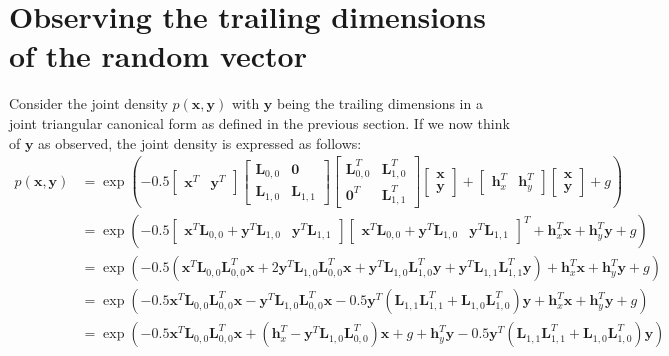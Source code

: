 \documentclass[oneside,english]{scrbook}
\begin{document}
\section{Observing the trailing dimensions of the random vector}
Consider the joint density $p(\bm{x},\bm{y})$ with $\bm{y}$ being the
trailing dimensions in a joint triangular canonical form as defined in
the previous section. If we now think of $\bm{y}$ as observed, the
joint density is expressed as follows:
\begin{align}
  p(\bm{x},\bm{y})
  &= \exp\left(-0.5
  \begin{bmatrix}
    \bm{x}^T & \bm{y}^T
  \end{bmatrix}
  \begin{bmatrix}
    \bm{L}_{0,0} & \bm{0}\\
    \bm{L}_{1,0} & \bm{L}_{1,1}
  \end{bmatrix}
  \begin{bmatrix}
    \bm{L}_{0,0}^T & \bm{L}_{1,0}^T\\
    \bm{0}^T & \bm{L}_{1,1}^T
  \end{bmatrix}
  \begin{bmatrix}
    \bm{x} \\ \bm{y}
  \end{bmatrix} +
  \begin{bmatrix}
    \bm{h}_x^T & \bm{h}_y^T
  \end{bmatrix}
  \begin{bmatrix}
    \bm{x} \\ \bm{y}
  \end{bmatrix} +
  g \right) \nonumber \\
  &= \exp\left(-0.5
  \begin{bmatrix}
    \bm{x}^T\bm{L}_{0,0}+\bm{y}^T\bm{L}_{1,0} & \bm{y}^T\bm{L}_{1,1}
  \end{bmatrix}
  \begin{bmatrix}
    \bm{x}^T\bm{L}_{0,0}+\bm{y}^T\bm{L}_{1,0} & \bm{y}^T\bm{L}_{1,1}
  \end{bmatrix}^T+
  \bm{h}_x^T\bm{x} + \bm{h}_y^T\bm{y} +  g \right) \nonumber\\
  &= \exp\left(-0.5\left(
    \bm{x}^T\bm{L}_{0,0}\bm{L}_{0,0}^T\bm{x}+2\bm{y}^T\bm{L}_{1,0}\bm{L}_{0,0}^T\bm{x} +  \bm{y}^T\bm{L}_{1,0}\bm{L}_{1,0}^T\bm{y} + \bm{y}^T\bm{L}_{1,1}\bm{L}_{1,1}^T\bm{y}\right)+
  \bm{h}_x^T\bm{x} + \bm{h}_y^T\bm{y} +  g \right) \nonumber\\
  &= \exp\left(
  -0.5\bm{x}^T\bm{L}_{0,0}\bm{L}_{0,0}^T\bm{x}-\bm{y}^T\bm{L}_{1,0}\bm{L}_{0,0}^T\bm{x}
  -0.5  \bm{y}^T(\bm{L}_{1,1}\bm{L}_{1,1}^T+\bm{L}_{1,0}\bm{L}_{1,0}^T)\bm{y}+
  \bm{h}_x^T\bm{x} + \bm{h}_y^T\bm{y} +  g \right) \nonumber\\
  &= \exp\left(
  -0.5\bm{x}^T\bm{L}_{0,0}\bm{L}_{0,0}^T\bm{x}+(\bm{h}_x^T-\bm{y}^T\bm{L}_{1,0}\bm{L}_{0,0}^T)\bm{x}+
  g + \bm{h}_y^T\bm{y} -0.5  \bm{y}^T(\bm{L}_{1,1}\bm{L}_{1,1}^T+\bm{L}_{1,0}\bm{L}_{1,0}^T)\bm{y}\right) \nonumber
\end{align}
\end{document}
